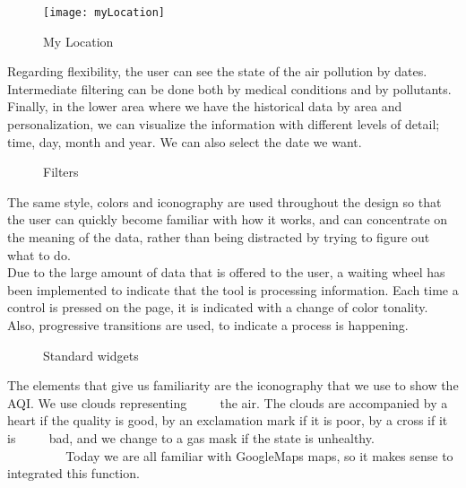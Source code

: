 \begin{figure}[ht]
    \centering
    \texttt{[image: myLocation]}
    \caption{My Location}
\end{figure}

Regarding flexibility, the user can see the state of the air pollution by dates. Intermediate filtering can be done both by medical conditions and by pollutants. Finally, in the lower area where we have
the historical data by area and personalization, we can visualize the information with different levels of detail; time, day, month and year. We can also
select the date we want.\\

\begin{figure}[ht]
    \centering
    \hfill
    \vfill
  
  \caption{Filters}
    \end{figure}
    The same style, colors and iconography are used throughout the design so that the user can quickly become familiar with how it works, and can
    concentrate on the meaning of the data, rather than being distracted by trying to figure out what to do.\\
    
    Due to the large amount of data that is offered to the user, a waiting wheel has been implemented to indicate
    that the tool is processing information. Each time a control is pressed on the page, it is indicated with a change
    of color tonality. Also, progressive transitions are used, to indicate a process is happening.

    
    \begin{figure}[ht]
        \centering
        \hfill
        \vfill
         \hfill
      
      \caption{Standard widgets}
        \end{figure}

        The elements that give us familiarity are the iconography that we use to show the AQI. We use clouds representing
             the air. The clouds are accompanied by a heart if the quality is good, by an exclamation mark if it is poor, by a cross if it is
             bad, and we change to a gas mask if the state is unhealthy.\\
            
             Today we are all familiar with GoogleMaps maps, so it makes sense to integrated this function.      

